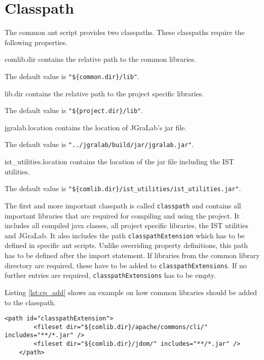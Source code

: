 \documentclass[a4paper,twoside,11pt,bibtotoc]{article}
\begin{document}
\section{Classpath}
\label{sec:classpath}
The common ant script provides two classpaths.
These classpaths require the following properties.

\begin{description*}
	\item[comlib.dir] contains the relative path to the common libraries.\par The default value is \texttt{"\$\{common.dir\}/lib"}.
	\item[lib.dir] contains the relative path to the project specific libraries.\par The default value is \texttt{"\$\{project.dir\}/lib"}.
	\item[jgralab.location] contains the location of JGraLab's jar file.\par The default value is \texttt{"../jgralab/build/jar/jgralab.jar"}.
	\item[ist\_utilities.location] contains the location of the jar file including the IST utilities.\par The default value is \texttt{"\$\{comlib.dir\}/ist\_utilities/ist\_utilities.jar"}.
\end{description*}

The first and more important classpath is called \texttt{classpath} and contains all important libraries that are required for compiling and using the project.
It includes all compiled java classes, all project specific libraries, the IST utilities and JGraLab.
It also includes the path \texttt{classpathExtension} which has to be defined in specific ant scripts.
Unlike overriding property definitions, this path has to be defined after the import statement.
If libraries from the common library directory are required, these have to be added to \texttt{classpathExtensions}.
If no further entries are required, \texttt{classpathExtensions} has to be empty.

Listing \ref{lst:cp_add} shows an example on how common libraries should be added to the classpath.

\begin{lstlisting}[caption=Adding common libraries to the classpath,label=lst:cp_add,float=!ht,language=ant]
	<path id="classpathExtension">
		<fileset dir="${comlib.dir}/apache/commons/cli/" includes="**/*.jar" />
		<fileset dir="${comlib.dir}/jdom/" includes="**/*.jar" />
	</path>
\end{lstlisting}
\end{document}
